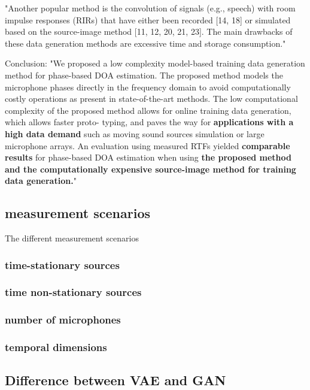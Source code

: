 \documentclass{article}
\begin{document}
"Another popular method is the convolution of signals (e.g., speech) with room impulse responses (RIRs) that have either been recorded [14, 18] or simulated based on the source-image method [11, 12, 20, 21, 23]. The main drawbacks of these data generation methods are excessive time and storage consumption."


Conclusion: 
"We proposed a low complexity model-based training data
generation method for phase-based DOA estimation. The
proposed method models the microphone phases directly
in the frequency domain to avoid computationally costly
operations as present in state-of-the-art methods. The low
computational complexity of the proposed method allows for
online training data generation, which allows faster proto-
typing, and paves the way for \textbf{applications with a high data
demand} such as moving sound sources simulation or large
microphone arrays. An evaluation using measured RTFs
yielded \textbf{comparable results} for phase-based DOA estimation
when using \textbf{the proposed method and the computationally
expensive source-image method for training data generation.}"

\subsection{measurement scenarios}

The different measurement scenarios

\subsubsection{time-stationary sources}

\subsubsection{time non-stationary sources}

\subsubsection{number of microphones}

\subsubsection{temporal dimensions} 





\subsection{Difference between VAE and GAN}
\end{document}
